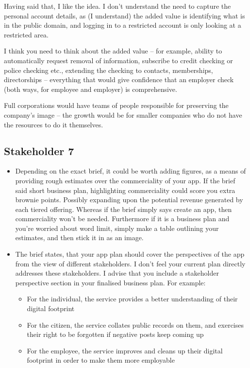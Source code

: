     Having said that, I like the idea.  I don't understand the need to capture the personal account details, as (I understand) the added value is identifying what is in the public domain, and logging in to a restricted account is only looking at a restricted area.

    I think you need to think about the added value – for example, ability to automatically request removal of information, subscribe to credit checking or police checking etc., extending the checking to contacts, memberships, directorships – everything that would give confidence that an employer check (both ways, for employee and employer) is comprehensive.

    Full corporations would have teams of people responsible for preserving the company's image – the growth would be for smaller companies who do not have the resources to do it themselves.

  \subsection{Stakeholder 7}

    \begin{itemize}
      \item Depending on the exact brief, it could be worth adding figures, as a means of providing rough estimates over the commerciality of your app. If the brief said short business plan, highlighting commerciality could score you extra brownie points. Possibly expanding upon the potential revenue generated by each tiered offering. Whereas if the brief simply says create an app, then commerciality won't be needed. Furthermore if it is a business plan and you're worried about word limit, simply make a table outlining your estimates, and then stick it in as an image.
      \item The brief states, that your app plan should cover the perspectives of the app from the view of different stakeholders. I don't feel your current plan directly addresses these stakeholders. I advise that you include a stakeholder perspective section in your finalised business plan. For example:
      \begin{itemize}
        \item For the individual, the service provides a better understanding of their digital footprint
        \item For the citizen, the service collates public records on them, and exercises their right to be forgotten if negative posts keep coming up
        \item For the employee, the service improves and cleans up their digital footprint in order to make them more employable
      \end{itemize}
    \end{itemize}

